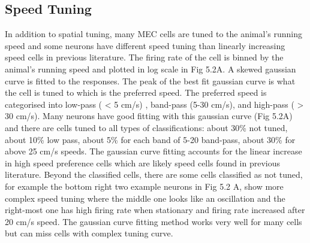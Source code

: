 \subsection{Speed Tuning}
In addition to spatial tuning, many MEC cells are tuned to the animal's running speed and some neurons have different speed tuning than linearly increasing speed cells in previous literature. The firing rate of the cell is binned by the animal's running speed and plotted in log scale in Fig 5.2A. A skewed gaussian curve is fitted to the responses. The peak of the best fit gaussian curve is what the cell is tuned to which is the preferred speed. The preferred speed is categorised into low-pass ( < 5 cm/s) , band-pass (5-30 cm/s), and high-pass ( > 30 cm/s). Many neurons have good fitting with this gaussian curve (Fig 5.2A) and there are cells tuned to all types of classifications: about 30\% not tuned, about 10\% low pass, about 5\% for each band of 5-20 band-pass, about 30\% for above 25 cm/s speeds. The gaussian curve fitting accounts for the linear increase in high speed preference cells which are likely speed cells found in previous literature. Beyond the classified cells, there are some cells classified as not tuned, for example the bottom right two example neurons in Fig 5.2 A, show more complex speed tuning where the middle one looks like an oscillation and the right-most one has high firing rate when stationary and firing rate increased after 20 cm/s speed. The gaussian curve fitting method works very well for many cells but can miss cells with complex tuning curve.
